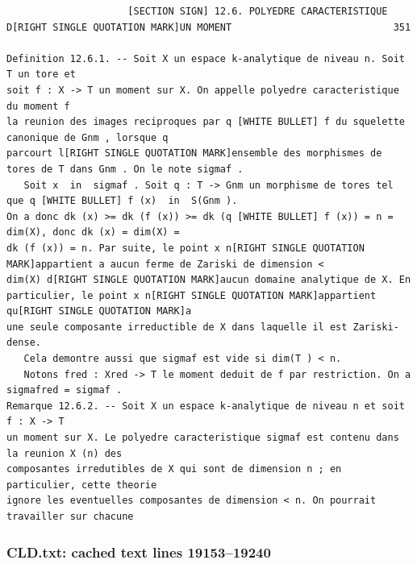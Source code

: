 \documentclass[
  11pt,
]{article}
\begin{document}
\begin{lstlisting}
                     [SECTION SIGN] 12.6. POLYEDRE CARACTERISTIQUE D[RIGHT SINGLE QUOTATION MARK]UN MOMENT                            351

Definition 12.6.1. -- Soit X un espace k-analytique de niveau n. Soit T un tore et
soit f : X -> T un moment sur X. On appelle polyedre caracteristique du moment f
la reunion des images reciproques par q [WHITE BULLET] f du squelette canonique de Gnm , lorsque q
parcourt l[RIGHT SINGLE QUOTATION MARK]ensemble des morphismes de tores de T dans Gnm . On le note sigmaf .
   Soit x  in  sigmaf . Soit q : T -> Gnm un morphisme de tores tel que q [WHITE BULLET] f (x)  in  S(Gnm ).
On a donc dk (x) >= dk (f (x)) >= dk (q [WHITE BULLET] f (x)) = n = dim(X), donc dk (x) = dim(X) =
dk (f (x)) = n. Par suite, le point x n[RIGHT SINGLE QUOTATION MARK]appartient a aucun ferme de Zariski de dimension <
dim(X) d[RIGHT SINGLE QUOTATION MARK]aucun domaine analytique de X. En particulier, le point x n[RIGHT SINGLE QUOTATION MARK]appartient qu[RIGHT SINGLE QUOTATION MARK]a
une seule composante irreductible de X dans laquelle il est Zariski-dense.
   Cela demontre aussi que sigmaf est vide si dim(T ) < n.
   Notons fred : Xred -> T le moment deduit de f par restriction. On a sigmafred = sigmaf .
Remarque 12.6.2. -- Soit X un espace k-analytique de niveau n et soit f : X -> T
un moment sur X. Le polyedre caracteristique sigmaf est contenu dans la reunion X (n) des
composantes irredutibles de X qui sont de dimension n ; en particulier, cette theorie
ignore les eventuelles composantes de dimension < n. On pourrait travailler sur chacune
\end{lstlisting}

\subsubsection{CLD.txt: cached text lines
19153--19240}\label{cld.txt-cached-text-lines-1915319240}
\end{document}
